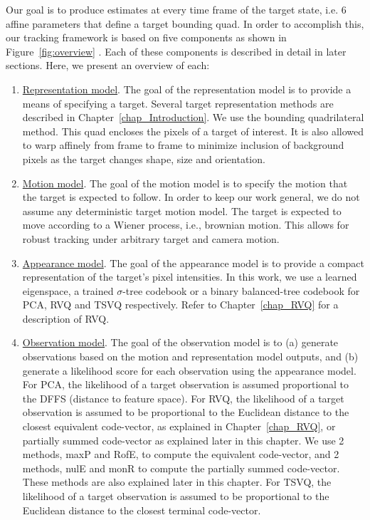 Our goal is to produce estimates at every time frame of the target state, i.e. 6 affine parameters that define a target bounding quad.  In order to accomplish this, our tracking framework is based on five components as shown in Figure~\ref{fig:overview} .  Each of these components is described in detail in later sections.  Here, we present an overview of each:

\begin{enumerate}
\item \underline{Representation model}.  The goal of the representation model is to provide a means of specifying a target.  Several target representation methods are described in Chapter~\ref{chap_Introduction}.  We use the bounding quadrilateral method.  This quad encloses the pixels of a target of interest.  It is also allowed to warp affinely from frame to frame to minimize inclusion of background pixels as the target changes shape, size and orientation.

\item \underline{Motion  model}.  The goal of the motion model is to specify the motion that the target is expected to follow.  In order to keep our work general, we do not assume any deterministic target motion model.  The target is expected to move according to a Wiener process, i.e., brownian motion.  This allows for robust tracking under arbitrary target and camera motion.

\item \underline{Appearance model}.  The goal of the appearance model is to provide a compact representation of the target's pixel intensities.  In this work, we use a learned eigenspace, a trained $\sigma$-tree codebook or a binary balanced-tree codebook for PCA, RVQ and TSVQ respectively.  Refer to Chapter~\ref{chap_RVQ} for a description of RVQ.

\item \underline{Observation model}.  The goal of the observation model is to (a) generate observations based on the motion and representation model outputs, and (b) generate a likelihood score for each observation using the appearance model.  For PCA, the likelihood of a target observation is assumed proportional to the DFFS (distance to feature space).  For RVQ, the likelihood of a target observation is assumed to be proportional to the Euclidean distance to the closest equivalent code-vector, as explained in Chapter~\ref{chap_RVQ}, or partially summed code-vector as explained later in this chapter.  We use 2 methods, maxP and RofE, to compute the equivalent code-vector, and 2 methods, nulE and monR to compute the partially summed code-vector.  These methods are also explained later in this chapter. For TSVQ, the likelihood of a target observation is assumed to be proportional to the Euclidean distance to the closest terminal code-vector.


\end{enumerate}
